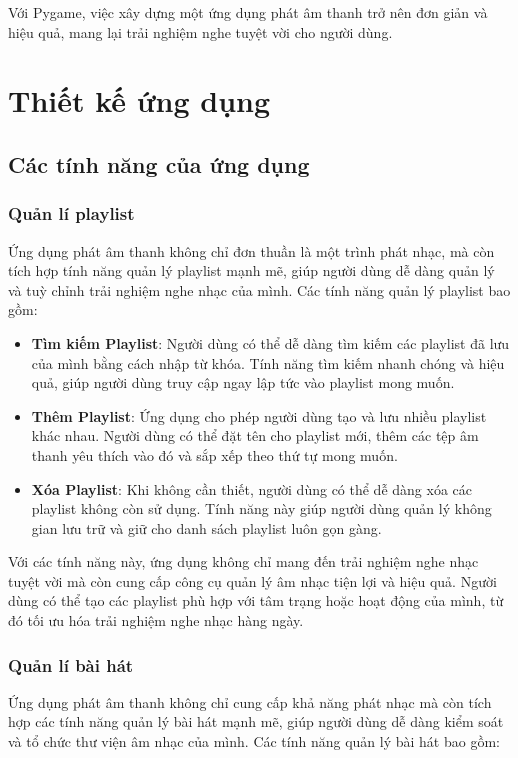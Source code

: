 \documentclass[a4paper]{article}
\begin{document}
Với Pygame, việc xây dựng một ứng dụng phát âm thanh trở nên đơn giản và hiệu quả, mang lại trải nghiệm nghe tuyệt vời cho người dùng.

\newpage

\section{Thiết kế ứng dụng}
\subsection{Các tính năng của ứng dụng}
\subsubsection{Quản lí playlist}
Ứng dụng phát âm thanh không chỉ đơn thuần là một trình phát nhạc, mà còn tích hợp tính năng quản lý playlist mạnh mẽ, giúp người dùng dễ dàng quản lý và tuỳ chỉnh trải nghiệm nghe nhạc của mình. Các tính năng quản lý playlist bao gồm:

\begin{itemize}
    \item \textbf{Tìm kiếm Playlist}: Người dùng có thể dễ dàng tìm kiếm các playlist đã lưu của mình bằng cách nhập từ khóa. Tính năng tìm kiếm nhanh chóng và hiệu quả, giúp người dùng truy cập ngay lập tức vào playlist mong muốn.
    \item \textbf{Thêm Playlist}: Ứng dụng cho phép người dùng tạo và lưu nhiều playlist khác nhau. Người dùng có thể đặt tên cho playlist mới, thêm các tệp âm thanh yêu thích vào đó và sắp xếp theo thứ tự mong muốn.
    \item \textbf{Xóa Playlist}: Khi không cần thiết, người dùng có thể dễ dàng xóa các playlist không còn sử dụng. Tính năng này giúp người dùng quản lý không gian lưu trữ và giữ cho danh sách playlist luôn gọn gàng.
\end{itemize}

Với các tính năng này, ứng dụng không chỉ mang đến trải nghiệm nghe nhạc tuyệt vời mà còn cung cấp công cụ quản lý âm nhạc tiện lợi và hiệu quả. Người dùng có thể tạo các playlist phù hợp với tâm trạng hoặc hoạt động của mình, từ đó tối ưu hóa trải nghiệm nghe nhạc hàng ngày.
\subsubsection{Quản lí bài hát}
Ứng dụng phát âm thanh không chỉ cung cấp khả năng phát nhạc mà còn tích hợp các tính năng quản lý bài hát mạnh mẽ, giúp người dùng dễ dàng kiểm soát và tổ chức thư viện âm nhạc của mình. Các tính năng quản lý bài hát bao gồm:
\end{document}
